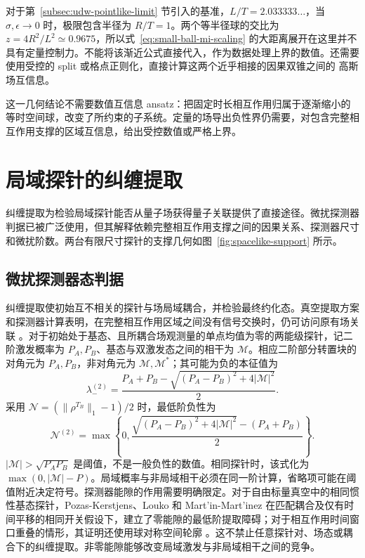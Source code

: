 \documentclass[UTF8,11pt,a4paper,fontset=none]{ctexart}
\begin{document}
对于第~\ref{subsec:udw-pointlike-limit} 节引入的基准，$L/T=2.033333\ldots$，当 $\sigma,\epsilon\to0$ 时，极限包含半径为 $R/T=1$。两个等半径球的交比为 $z=4R^2/L^2\simeq0.9675$，所以式~\eqref{eq:small-ball-mi-scaling} 的大距离展开在这里并不具有定量控制力。不能将该渐近公式直接代入，作为数据处理上界的数值。还需要使用受控的 split 或格点正则化，直接计算这两个近乎相接的因果双锥之间的 高斯场互信息。

这一几何结论不需要数值互信息 ansatz：把固定时长相互作用归属于逐渐缩小的等时空间球，改变了所约束的子系统。定量的场导出负性界仍需要，对包含完整相互作用支撑的区域互信息，给出受控数值或严格上界。

\section{局域探针的纠缠提取}
\label{sec:harvesting}
纠缠提取为检验局域探针能否从量子场获得量子关联提供了直接途径。微扰探测器判据已被广泛使用，但其解释依赖完整相互作用支撑之间的因果关系、探测器尺寸和微扰阶数。两台有限尺寸探针的支撑几何如图~\ref{fig:spacelike-support} 所示。

\subsection{微扰探测器态判据}
纠缠提取使初始互不相关的探针与场局域耦合，并检验最终约化态。真空提取方案和探测器计算表明，在完整相互作用区域之间没有信号交换时，仍可访问原有场关联 \cite{Reznik2003,ReznikRetzkerSilman2005,PozasKerstjens2015}。对于初始处于基态、且所耦合场观测量的单点均值为零的两能级探针，记二阶激发概率为 $P_A,P_B$、基态与双激发态之间的相干为 $\mathcal M$。相应二阶部分转置块的对角元为 $P_A,P_B$，非对角元为 $\mathcal M,\mathcal M^*$；其可能为负的本征值为
\begin{equation}
\lambda_-^{(2)}=\frac{P_A+P_B-\sqrt{(P_A-P_B)^2+4|\mathcal M|^2}}{2}.
\end{equation}
采用 $\mathcal N=(\|\rho^{T_B}\|_1-1)/2$ 时，最低阶负性为
\begin{equation}
\mathcal N^{(2)}=\max\!\left\{0,
\frac{\sqrt{(P_A-P_B)^2+4|\mathcal M|^2}-(P_A+P_B)}{2}\right\}.
\label{eq:negativity}
\end{equation}
$|\mathcal M|>\sqrt{P_AP_B}$ 是阈值，不是一般负性的数值。相同探针时，该式化为 $\max(0,|\mathcal M|-P)$。局域概率与非局域相干必须在同一阶计算，省略项可能在阈值附近决定符号。探测器能隙的作用需要明确限定。对于自由标量真空中的相同惯性基态探针，Pozas-Kerstjens、Louko 和 Mart'{i}n-Mart'{i}nez 在匹配耦合及仅有时间平移的相同开关假设下，建立了零能隙的最低阶提取障碍；对于相互作用时间窗口重叠的情形，其证明还使用球对称空间轮廓 \cite{PozasKerstjensLoukoMartinez2017}。这不禁止任意探针对、场态或耦合下的纠缠提取。非零能隙能够改变局域激发与非局域相干之间的竞争。
\end{document}
